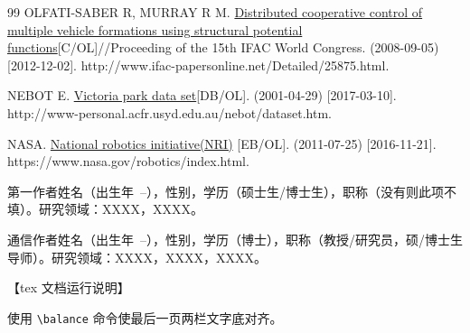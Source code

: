 \documentclass{JQRnew}
\begin{document}
\begin{thebibliography}{99}
 OLFATI-SABER R, MURRAY R M. \href{http://www.ifac-papersonline.net/Detailed/25875.html}{Distributed cooperative control of multiple vehicle formations using structural potential functions}[C/OL]//Proceeding of the 15th IFAC World Congress. (2008-09-05) [2012-12-02]. http://www.ifac-papersonline.net/Detailed/25875.html.


 NEBOT E. \href{http://www-personal.acfr.usyd.edu.au/nebot/dataset.htm}{Victoria park data set}[DB/OL]. (2001-04-29) [2017-03-10]. http://www-personal.acfr.usyd.edu.au/nebot/dataset.htm.


 NASA. \href{https://www.nasa.gov/robotics/index.html}{National robotics initiative(NRI)} [EB/OL]. (2011-07-25) [2016-11-21]. https://www.nasa.gov/robotics/index.html.

\end{thebibliography}

\begin{AuthorIntroduction}

\Intro 第一作者姓名（出生年~--），性别，学历（硕士生/博士生），职称（没有则此项不填）。研究领域：XXXX，XXXX。

\Intro 通信作者姓名（出生年~--），性别，学历（博士），职称（教授/研究员，硕/博士生导师）。研究领域：XXXX，XXXX，XXXX。
%
\end{AuthorIntroduction}


【tex 文档运行说明】

使用 \verb|\balance| 命令使最后一页两栏文字底对齐。
\balance
\end{document}
